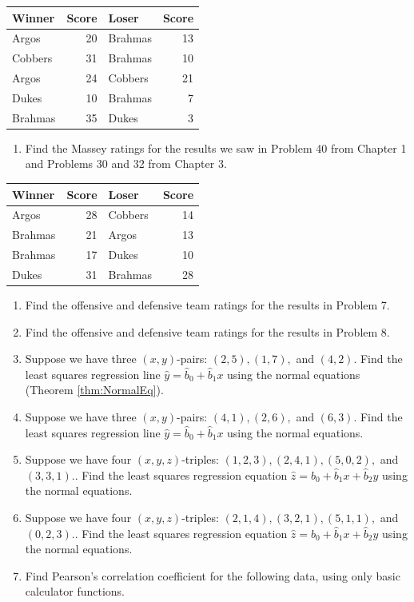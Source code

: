 \documentclass[
]{book}
\providecommand{\tightlist}{%
  \setlength{\itemsep}{0pt}\setlength{\parskip}{0pt}}
\theoremstyle{definition}
\theoremstyle{definition}
\theoremstyle{definition}
\theoremstyle{definition}
\theoremstyle{remark}
\begin{document}
\begin{longtable}{lrlr}
\toprule
Winner & Score & Loser & Score\\
\midrule
Argos & 20 & Brahmas & 13\\
Cobbers & 31 & Brahmas & 10\\
Argos & 24 & Cobbers & 21\\
Dukes & 10 & Brahmas & 7\\
Brahmas & 35 & Dukes & 3\\
\bottomrule
\end{longtable}

\begin{enumerate}
\def\labelenumi{\arabic{enumi}.}
\setcounter{enumi}{7}
\tightlist
\item
  Find the Massey ratings for the results we saw in Problem 40 from Chapter 1 and Problems 30 and 32 from Chapter 3.
\end{enumerate}

\begin{longtable}{lrlr}
\toprule
Winner & Score & Loser & Score\\
\midrule
Argos & 28 & Cobbers & 14\\
Brahmas & 21 & Argos & 13\\
Brahmas & 17 & Dukes & 10\\
Dukes & 31 & Brahmas & 28\\
\bottomrule
\end{longtable}

\begin{enumerate}
\def\labelenumi{\arabic{enumi}.}
\setcounter{enumi}{8}
\item
  Find the offensive and defensive team ratings for the results in Problem 7.
\item
  Find the offensive and defensive team ratings for the results in Problem 8.
\item
  Suppose we have three \((x,y)\)-pairs: \((2,5),(1,7),\) and \((4,2)\). Find the least squares regression line \(\hat{y}=\hat{b}_0+\hat{b}_1x\) using the normal equations (Theorem \ref{thm:NormalEq}).
\item
  Suppose we have three \((x,y)\)-pairs: \((4,1),(2,6),\) and \((6,3)\). Find the least squares regression line \(\hat{y}=\hat{b}_0+\hat{b}_1x\) using the normal equations.
\item
  Suppose we have four \((x,y,z)\)-triples: \((1,2,3),(2,4,1),(5,0,2),\) and \((3,3,1).\). Find the least squares regression equation \(\hat{z}=\hat{b}_0+\hat{b}_1x+\hat{b}_2y\) using the normal equations.
\item
  Suppose we have four \((x,y,z)\)-triples: \((2,1,4),(3,2,1),(5,1,1),\) and \((0,2,3).\). Find the least squares regression equation \(\hat{z}=\hat{b}_0+\hat{b}_1x+\hat{b}_2y\) using the normal equations.
\item
  Find Pearson's correlation coefficient for the following data, using only basic calculator functions.
\end{enumerate}
\end{document}
